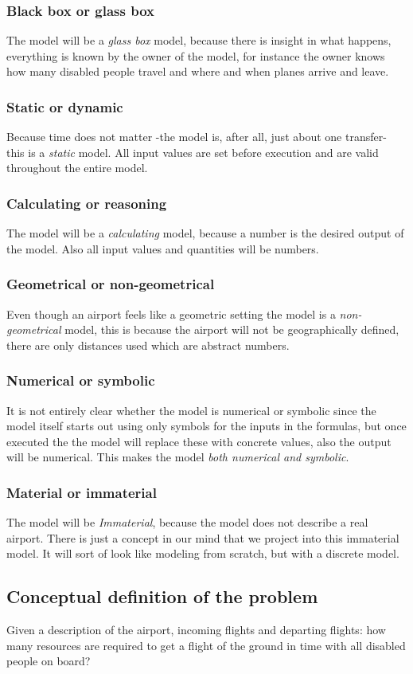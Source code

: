 \documentclass[a4paper, 11pt, notitlepage]{report}
\begin{document}
\subsubsection{Black box or glass box}
The model will be a \emph{glass box} model, because there is insight in what happens, everything is known by the owner of the model, for instance the owner knows how many disabled people travel and where and when planes arrive and leave.
\subsubsection{Static or dynamic}
Because time does not matter -the model is, after all, just about one transfer- this is a \emph{static} model. All input values are set before execution and are valid throughout the entire model.
\subsubsection{Calculating or reasoning}
The model will be a \emph{calculating} model, because a number is the desired output of the model. Also all input values and quantities will be numbers.
\subsubsection{Geometrical or non-geometrical}
Even though an airport feels like a geometric setting the model is a \emph{non-geometrical} model, this is because the airport will not be geographically defined, there are only distances used which are abstract numbers.
\subsubsection{Numerical or symbolic}
It is not entirely clear whether the model is numerical or symbolic since the model itself starts out using only symbols for the inputs in the formulas, but once executed the the model will replace these with concrete values, also the output will be numerical. This makes the model \emph{both numerical and symbolic}.
\subsubsection{Material or immaterial}
The model will be \emph{Immaterial}, because the model does not describe a real airport. There is just a concept in our mind that we project into this immaterial model. It will sort of look like modeling from scratch, but with a discrete model.
\subsection{Conceptual definition of the problem}
Given a description of the airport, incoming flights and departing flights: how many resources are required to get a flight of the ground in time with all disabled people on board?
\end{document}
